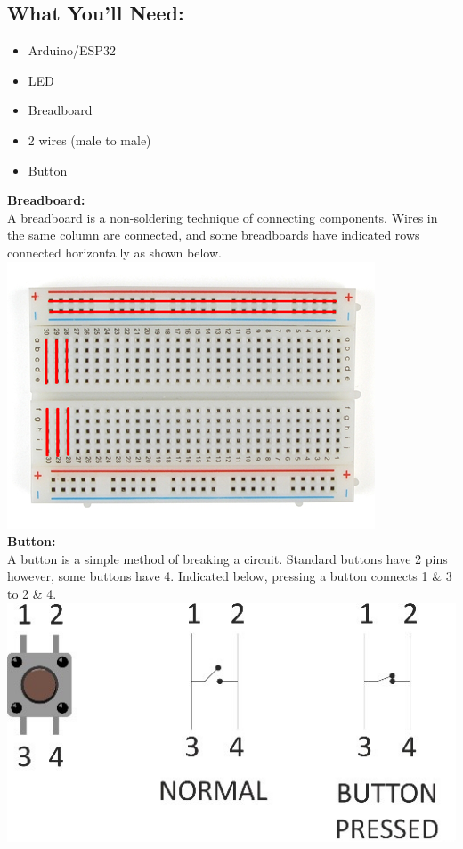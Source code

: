 \documentclass[a4paper,12pt]{report}
\begin{document}
    \subsection*{What You'll Need:}
        \begin{itemize}
            \item Arduino/ESP32
            \item LED
            \item Breadboard
            \item 2 wires (male to male)
            \item Button
        \end{itemize}
        \begin{mdframed}[linewidth = 3, linecolor = turbo_purple]
            \textbf{Breadboard:} \\
            A breadboard is a non-soldering technique of connecting components. Wires in the same column are connected, and some breadboards have indicated rows connected horizontally as shown below. \\
            \includegraphics[scale = 0.7]{Assets/breadboard.png} \\
            \textbf{Button:} \\
            A button is a simple method of breaking a circuit. Standard buttons have 2 pins however, some buttons have 4. Indicated below, pressing a button connects 1 & 3 to 2 & 4. \\
            \includegraphics[scale = 1]{Assets/button.jpg}
        \end{mdframed}
\newpage
\end{document}
